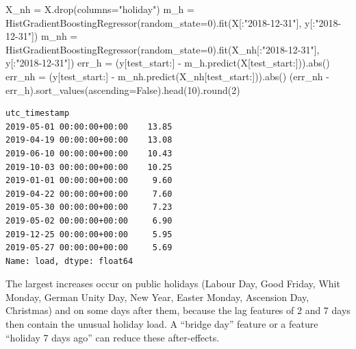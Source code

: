 \documentclass[
  letterpaper,
  DIV=11,
  numbers=noendperiod]{scrreprt}
\newenvironment{Shaded}{\begin{snugshade}}{\end{snugshade}}
\newcommand{\BuiltInTok}[1]{\textcolor[rgb]{0.00,0.23,0.31}{#1}}
\newcommand{\DecValTok}[1]{\textcolor[rgb]{0.68,0.00,0.00}{#1}}
\newcommand{\NormalTok}[1]{\textcolor[rgb]{0.00,0.23,0.31}{#1}}
\newcommand{\OperatorTok}[1]{\textcolor[rgb]{0.37,0.37,0.37}{#1}}
\newcommand{\StringTok}[1]{\textcolor[rgb]{0.13,0.47,0.30}{#1}}
\newcommand{\VariableTok}[1]{\textcolor[rgb]{0.07,0.07,0.07}{#1}}
\begin{document}
\begin{tcolorbox}[enhanced jigsaw, left=2mm, title=\textcolor{quarto-callout-caution-color}{\faFire}\hspace{0.5em}{Solution to Exercise 3}, opacityback=0, breakable, rightrule=.15mm, arc=.35mm, toptitle=1mm, colbacktitle=quarto-callout-caution-color!10!white, opacitybacktitle=0.6, coltitle=black, colframe=quarto-callout-caution-color-frame, bottomrule=.15mm, leftrule=.75mm, bottomtitle=1mm, titlerule=0mm, toprule=.15mm, colback=white]

\begin{Shaded}
\begin{Highlighting}[]
\NormalTok{X\_nh }\OperatorTok{=}\NormalTok{ X.drop(columns}\OperatorTok{=}\StringTok{"holiday"}\NormalTok{)}
\NormalTok{m\_h }\OperatorTok{=}\NormalTok{ HistGradientBoostingRegressor(random\_state}\OperatorTok{=}\DecValTok{0}\NormalTok{).fit(X[:}\StringTok{"2018{-}12{-}31"}\NormalTok{], y[:}\StringTok{"2018{-}12{-}31"}\NormalTok{])}
\NormalTok{m\_nh }\OperatorTok{=}\NormalTok{ HistGradientBoostingRegressor(random\_state}\OperatorTok{=}\DecValTok{0}\NormalTok{).fit(X\_nh[:}\StringTok{"2018{-}12{-}31"}\NormalTok{], y[:}\StringTok{"2018{-}12{-}31"}\NormalTok{])}
\NormalTok{err\_h }\OperatorTok{=}\NormalTok{ (y[test\_start:] }\OperatorTok{{-}}\NormalTok{ m\_h.predict(X[test\_start:])).}\BuiltInTok{abs}\NormalTok{()}
\NormalTok{err\_nh }\OperatorTok{=}\NormalTok{ (y[test\_start:] }\OperatorTok{{-}}\NormalTok{ m\_nh.predict(X\_nh[test\_start:])).}\BuiltInTok{abs}\NormalTok{()}
\NormalTok{(err\_nh }\OperatorTok{{-}}\NormalTok{ err\_h).sort\_values(ascending}\OperatorTok{=}\VariableTok{False}\NormalTok{).head(}\DecValTok{10}\NormalTok{).}\BuiltInTok{round}\NormalTok{(}\DecValTok{2}\NormalTok{)}
\end{Highlighting}
\end{Shaded}

\begin{verbatim}
utc_timestamp
2019-05-01 00:00:00+00:00    13.85
2019-04-19 00:00:00+00:00    13.08
2019-06-10 00:00:00+00:00    10.43
2019-10-03 00:00:00+00:00    10.25
2019-01-01 00:00:00+00:00     9.60
2019-04-22 00:00:00+00:00     7.60
2019-05-30 00:00:00+00:00     7.23
2019-05-02 00:00:00+00:00     6.90
2019-12-25 00:00:00+00:00     5.95
2019-05-27 00:00:00+00:00     5.69
Name: load, dtype: float64
\end{verbatim}

The largest increases occur on public holidays (Labour Day, Good Friday,
Whit Monday, German Unity Day, New Year, Easter Monday, Ascension Day,
Christmas) and on some days after them, because the lag features of 2
and 7 days then contain the unusual holiday load. A ``bridge day''
feature or a feature ``holiday 7 days ago'' can reduce these
after-effects.

\end{tcolorbox}
\end{document}
